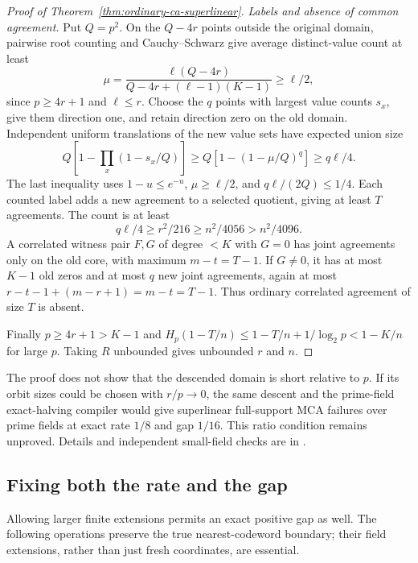 \begin{proof}[Proof of Theorem~\ref{thm:ordinary-ca-superlinear}]
\emph{Labels and absence of common agreement.} Put $Q=p^2$.
On the $Q-4r$ points outside the original domain, pairwise root counting
and Cauchy--Schwarz give average distinct-value count at least
\[
 \mu=\frac{\ell(Q-4r)}{Q-4r+(\ell-1)(K-1)}\ge\ell/2,
\]
since $p\ge4r+1$ and $\ell\le r$. Choose the $q$ points with largest
value counts $s_x$, give them direction one, and retain direction zero
on the old domain. Independent uniform translations of the new value
sets have expected union size
\[
 Q\left[1-\prod_x(1-s_x/Q)\right]
 \ge Q[1-(1-\mu/Q)^q]\ge q\ell/4.
\]
The last inequality uses $1-u\le e^{-u}$, $\mu\ge\ell/2$, and
$q\ell/(2Q)\le1/4$. Each counted label adds a new agreement to a
selected quotient, giving at least $T$ agreements. The count is at least
\[
 q\ell/4\ge r^2/216\ge n^2/4056>n^2/4096.
\]
A correlated witness pair $F,G$ of degree $<K$ with $G=0$ has joint
agreements only on the old core, with maximum $m-t=T-1$. If $G\ne0$,
it has at most $K-1$ old zeros and at most $q$ new joint agreements,
again at most $r-t-1+(m-r+1)=m-t=T-1$. Thus ordinary correlated
agreement of size $T$ is absent.

Finally $p\ge4r+1>K-1$ and
$H_p(1-T/n)\le1-T/n+1/\log_2p<1-K/n$ for large $p$.
Taking $R$ unbounded gives unbounded $r$ and $n$.
\end{proof}

The proof does not show that the descended domain is short relative to
$p$. If its orbit sizes could be chosen with $r/p\to0$, the same descent
and the prime-field exact-halving compiler would give superlinear
full-support MCA failures over prime fields at exact rate $1/8$ and gap
$1/16$. This ratio condition remains unproved. Details and independent
small-field checks are in .


\subsection{Fixing both the rate and the gap}

Allowing larger finite extensions permits an exact positive gap as well.
The following operations preserve the true nearest-codeword boundary;
their field extensions, rather than just fresh coordinates, are essential.

